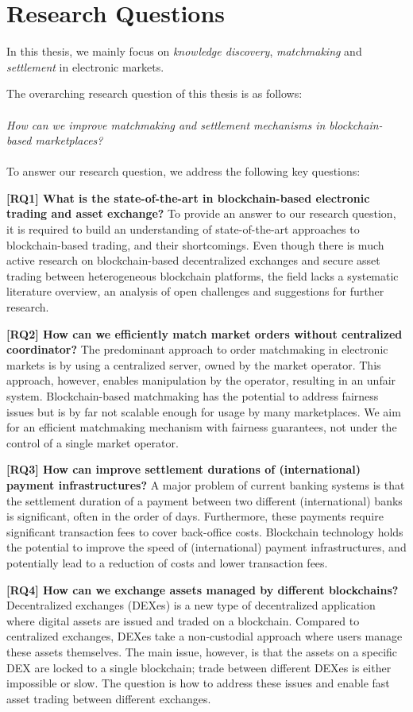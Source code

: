 \section{Research Questions}
In this thesis, we mainly focus on \emph{knowledge discovery}, \emph{matchmaking} and \emph{settlement} in electronic markets.

The overarching research question of this thesis is as follows:\\\\
\emph{How can we improve matchmaking and settlement mechanisms in blockchain-based marketplaces?}\\\\
To answer our research question, we address the following key questions:

\textbf{[RQ1] What is the state-of-the-art in blockchain-based electronic trading and asset exchange?}
To provide an answer to our research question, it is required to build an understanding of state-of-the-art approaches to blockchain-based trading, and their shortcomings.
Even though there is much active research on blockchain-based decentralized exchanges and secure asset trading between heterogeneous blockchain platforms, the field lacks a systematic literature overview, an analysis of open challenges and suggestions for further research.

\textbf{[RQ2] How can we efficiently match market orders without centralized coordinator?}
The predominant approach to order matchmaking in electronic markets is by using a centralized server, owned by the market operator.
This approach, however, enables manipulation by the operator, resulting in an unfair system.
Blockchain-based matchmaking has the potential to address fairness issues but is by far not scalable enough for usage by many marketplaces.
We aim for an efficient matchmaking mechanism with fairness guarantees, not under the control of a single market operator.

\textbf{[RQ3] How can improve settlement durations of (international) payment infrastructures?}
A major problem of current banking systems is that the settlement duration of a payment between two different (international) banks is significant, often in the order of days.
Furthermore, these payments require significant transaction fees to cover back-office costs.
Blockchain technology holds the potential to improve the speed of (international) payment infrastructures, and potentially lead to a reduction of costs and lower transaction fees.

\textbf{[RQ4] How can we exchange assets managed by different blockchains?}
Decentralized exchanges (DEXes) is a new type of decentralized application where digital assets are issued and traded on a blockchain.
Compared to centralized exchanges, DEXes take a non-custodial approach where users manage these assets themselves.
The main issue, however, is that the assets on a specific DEX are locked to a single blockchain; trade between different DEXes is either impossible or slow.
The question is how to address these issues and enable fast asset trading between different exchanges.

